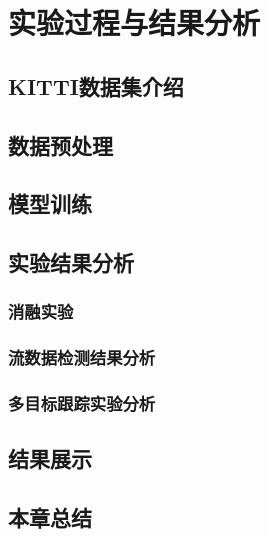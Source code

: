 
\chapter{实验过程与结果分析}
\label{experiment}


\section{KITTI数据集介绍}
\label{kitti}


\section{数据预处理}
\label{preprocessing}


\section{模型训练}
\label{training}


\section{实验结果分析}
\label{results}

\subsection{消融实验}
\label{ablation_study}

\subsection{流数据检测结果分析}
\label{stream_result}

\subsection{多目标跟踪实验分析}
\label{mot_result}

\section{结果展示}
\label{show}

\section{本章总结}
\label{exp_conclusion}


\ifprint
	\newpage
	\thispagestyle{empty}
	\mbox{}
	
	\clearpage
	\setcounter{page}{10}
\fi